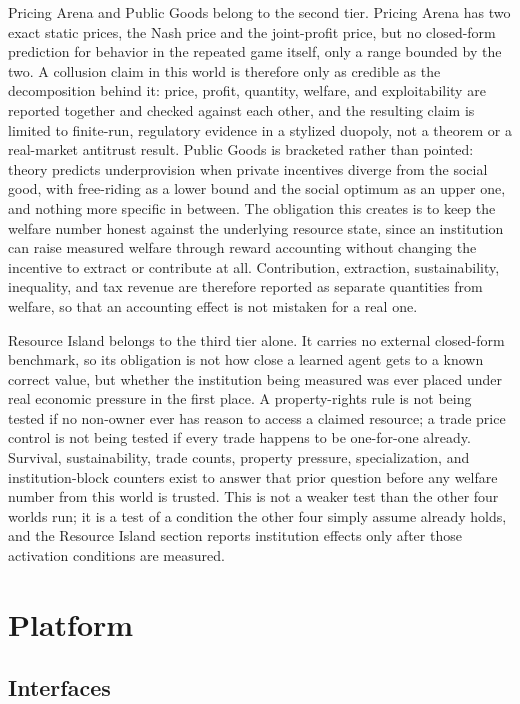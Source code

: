 \documentclass[11pt]{article}
\begin{document}
Pricing Arena and Public Goods belong to the second tier. Pricing Arena has two exact static prices, the Nash price and the joint-profit price, but no closed-form prediction for behavior in the repeated game itself, only a range bounded by the two. A collusion claim in this world is therefore only as credible as the decomposition behind it: price, profit, quantity, welfare, and exploitability are reported together and checked against each other, and the resulting claim is limited to finite-run, regulatory evidence in a stylized duopoly, not a theorem or a real-market antitrust result. Public Goods is bracketed rather than pointed: theory predicts underprovision when private incentives diverge from the social good, with free-riding as a lower bound and the social optimum as an upper one, and nothing more specific in between. The obligation this creates is to keep the welfare number honest against the underlying resource state, since an institution can raise measured welfare through reward accounting without changing the incentive to extract or contribute at all. Contribution, extraction, sustainability, inequality, and tax revenue are therefore reported as separate quantities from welfare, so that an accounting effect is not mistaken for a real one.

Resource Island belongs to the third tier alone. It carries no external closed-form benchmark, so its obligation is not how close a learned agent gets to a known correct value, but whether the institution being measured was ever placed under real economic pressure in the first place. A property-rights rule is not being tested if no non-owner ever has reason to access a claimed resource; a trade price control is not being tested if every trade happens to be one-for-one already. Survival, sustainability, trade counts, property pressure, specialization, and institution-block counters exist to answer that prior question before any welfare number from this world is trusted. This is not a weaker test than the other four worlds run; it is a test of a condition the other four simply assume already holds, and the Resource Island section reports institution effects only after those activation conditions are measured.

\section{Platform}

\subsection{Interfaces}
\end{document}
